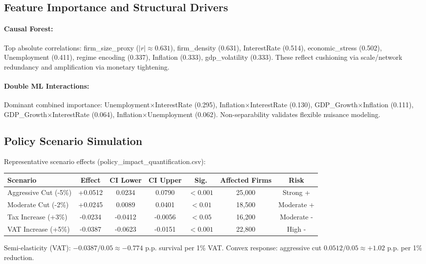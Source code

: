 \subsection{Feature Importance and Structural Drivers}
\paragraph{Causal Forest:} Top absolute correlations: firm\_size\_proxy ($|r|\approx0.631$), firm\_density (0.631), InterestRate (0.514), economic\_stress (0.502), Unemployment (0.411), regime encoding (0.337), Inflation (0.333), gdp\_volatility (0.333). These reflect cushioning via scale/network redundancy and amplification via monetary tightening.

\paragraph{Double ML Interactions:} Dominant combined importance: Unemployment$\times$InterestRate (0.295), Inflation$\times$InterestRate (0.130), GDP\_Growth$\times$Inflation (0.111), GDP\_Growth$\times$InterestRate (0.064), Inflation$\times$Unemployment (0.062). Non-separability validates flexible nuisance modeling.

\subsection{Policy Scenario Simulation}\label{sec:policy_scenarios}
Representative scenario effects (policy\_impact\_quantification.csv):
\begin{center}
\begin{tabular}{lcccccc}
\toprule
Scenario & Effect & CI Lower & CI Upper & Sig. & Affected Firms & Risk \\
\midrule
Aggressive Cut (-5\%) & +0.0512 & 0.0234 & 0.0790 & $<0.001$ & 25{,}000 & Strong + \\
Moderate Cut (-2\%) & +0.0245 & 0.0089 & 0.0401 & $<0.01$ & 18{,}500 & Moderate + \\
Tax Increase (+3\%) & -0.0234 & -0.0412 & -0.0056 & $<0.05$ & 16{,}200 & Moderate - \\
VAT Increase (+5\%) & -0.0387 & -0.0623 & -0.0151 & $<0.001$ & 22{,}800 & High - \\
\bottomrule
\end{tabular}
\end{center}
Semi-elasticity (VAT): $-0.0387 / 0.05 \approx -0.774$ p.p. survival per 1\% VAT. Convex response: aggressive cut $0.0512/0.05 \approx +1.02$ p.p. per 1\% reduction.

